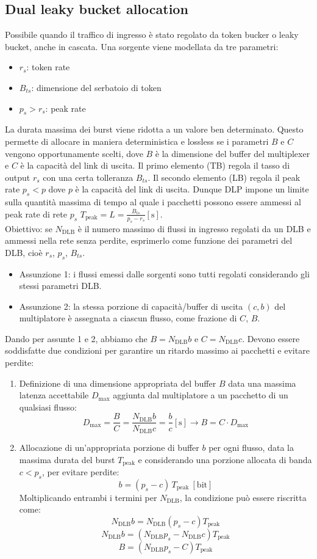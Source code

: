 \subsection{Dual leaky bucket allocation}
Possibile quando il traffico di ingresso è stato regolato da token bucker o leaky bucket, anche in cascata.
Una sorgente viene modellata da tre parametri:
\begin{itemize}
	\item $r_s$: token rate
	\item $B_{ts}$: dimensione del serbatoio di token
	\item $p_s>r_s$: peak rate
\end{itemize}
La durata massima dei burst viene ridotta a un valore ben determinato.
Questo permette di allocare in maniera deterministica e lossless se i parametri $B$ e $C$ vengono opportunamente scelti, dove 
$B$ è la dimensione del buffer del multiplexer e $C$ è la capacità del link di uscita.
Il primo elemento (TB) regola il tasso di output $r_s$ con una certa tolleranza $B_{ts}$.
Il secondo elemento (LB) regola il peak rate $p_s<p$ dove $p$ è la capacità del link di uscita.
Dunque DLP impone un limite sulla quantità massima di tempo al quale i pacchetti possono essere ammessi al peak rate di rete $p_s$
$T_{\text{peak}}=L=\frac{B_{ts}}{p_s-r_s} [\text{s}]$.
\\
Obiettivo: se $N_{\text{DLB}}$ è il numero massimo di flussi in ingresso regolati da un DLB e ammessi nella rete senza perdite, esprimerlo come funzione dei parametri del DLB, cioè $r_s$, $p_s$, $B_{ts}$.
\begin{itemize}
\item Assunzione 1: i flussi emessi dalle sorgenti sono tutti regolati considerando gli stessi parametri DLB.
\item Assunzione 2: la stessa porzione di capacità/buffer di uscita $(c,b)$ del multiplatore è assegnata a ciascun flusso, come frazione di $C$, $B$.
\end{itemize}
Dando per assunte 1 e 2, abbiamo che $B = N_{\text{DLB}}b$ e $C = N_{\text{DLB}}c$.
Devono essere soddisfatte due condizioni per garantire un ritardo massimo ai pacchetti e evitare perdite:
\begin{enumerate}
\item Definizione di una dimensione appropriata del buffer $B$ data una massima latenza accettabile $D_{\max}$ aggiunta dal multiplatore a un pacchetto di un qualsiasi flusso:
\[
D_{\max} = \frac{B}{C} = \frac{N_{\text{DLB}}b}{N_{\text{DLB}}c} = \frac{b}{c} [\text{s}] \rightarrow B = C \cdot D_{\max}
\]
\item Allocazione di un'appropriata porzione di buffer $b$ per ogni flusso, data la massima durata del burst $T_{\text{peak}}$ e considerando una porzione allocata di banda $c < p_s$, per evitare perdite:
\[
b = (p_s - c)\,T_{\text{peak}} \ [\text{bit}]
\]
\noindent
Moltiplicando entrambi i termini per $N_{\text{DLB}}$, la condizione può essere riscritta come:
\[
N_{\text{DLB}}b = N_{\text{DLB}}(p_s - c)T_{\text{peak}}
\]
\[
N_{\text{DLB}}b = (N_{\text{DLB}}p_s - N_{\text{DLB}}c)T_{\text{peak}}
\]
\[
B = (N_{\text{DLB}}p_s - C) T_{\text{peak}}
\]
\end{enumerate}
